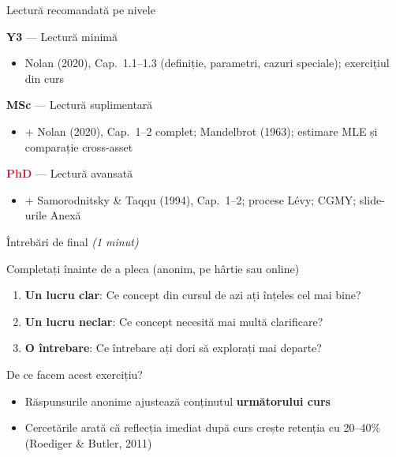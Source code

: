 \documentclass[9pt, aspectratio=169, t]{beamer}
\theoremstyle{definition}
\begin{document}
\begin{frame}{Lectură recomandată pe nivele}
\begin{block}{\textcolor{Forest}{\textbf{Y3}} --- Lectură minimă}
\begin{itemize}\setlength\itemsep{0pt}
\item Nolan (2020), Cap.\ 1.1--1.3 (definiție, parametri, cazuri speciale); exercițiul din curs
\end{itemize}
\end{block}
\begin{block}{\textcolor{MainBlue}{\textbf{MSc}} --- Lectură suplimentară}
\begin{itemize}\setlength\itemsep{0pt}
\item + Nolan (2020), Cap.\ 1--2 complet; Mandelbrot (1963); estimare MLE și comparație cross-asset
\end{itemize}
\end{block}
\begin{block}{\textcolor{Crimson}{\textbf{PhD}} --- Lectură avansată}
\begin{itemize}\setlength\itemsep{0pt}
\item + Samorodnitsky \& Taqqu (1994), Cap.\ 1--2; procese L\'{e}vy; CGMY; slide-urile Anexă
\end{itemize}
\end{block}
\end{frame}

\begin{frame}{Întrebări de final \hfill {\normalsize\textcolor{MediumGray}{\textit{(1 minut)}}}}
\begin{alertblock}{Completați înainte de a pleca (anonim, pe hârtie sau online)}
\begin{enumerate}\setlength\itemsep{6pt}
\item \textbf{Un lucru clar}: Ce concept din cursul de azi ați înțeles cel mai bine?
\item \textbf{Un lucru neclar}: Ce concept necesită mai multă clarificare?
\item \textbf{O întrebare}: Ce întrebare ați dori să explorați mai departe?
\end{enumerate}
\end{alertblock}
\vspace{0.3cm}
\begin{block}{De ce facem acest exercițiu?}
\begin{itemize}\setlength\itemsep{2pt}
\item Răspunsurile anonime ajustează conținutul \textbf{următorului curs}
\item Cercetările arată că reflecția imediat după curs crește retenția cu 20--40\% (Roediger \& Butler, 2011)
\end{itemize}
\end{block}
\end{frame}
\end{document}
